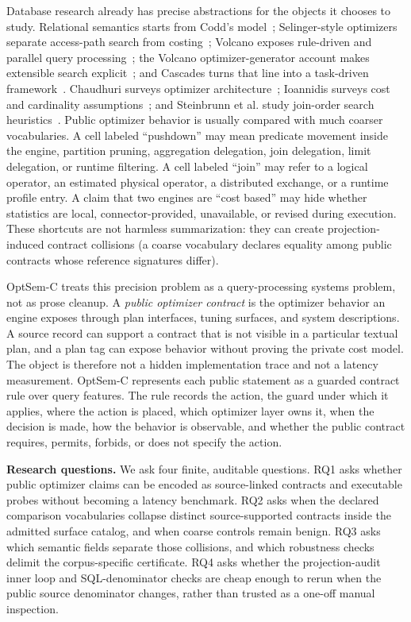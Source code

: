 Database research already has precise abstractions for the objects it chooses to study.  Relational semantics starts from Codd's model~\cite{codd1970relational}; Selinger-style optimizers separate access-path search from costing~\cite{selinger1979access}; Volcano exposes rule-driven and parallel query processing~\cite{graefe1990volcano}; the Volcano optimizer-generator account makes extensible search explicit~\cite{graefe1993volcano}; and Cascades turns that line into a task-driven framework~\cite{graefe1995cascades}.  Chaudhuri surveys optimizer architecture~\cite{chaudhuri1998overview}; Ioannidis surveys cost and cardinality assumptions~\cite{ioannidis1996query}; and Steinbrunn et al. study join-order search heuristics~\cite{steinbrunn1997heuristic}.  Public optimizer behavior is usually compared with much coarser vocabularies.  A cell labeled ``pushdown'' may mean predicate movement inside the engine, partition pruning, aggregation delegation, join delegation, limit delegation, or runtime filtering.  A cell labeled ``join'' may refer to a logical operator, an estimated physical operator, a distributed exchange, or a runtime profile entry.  A claim that two engines are ``cost based'' may hide whether statistics are local, connector-provided, unavailable, or revised during execution.  These shortcuts are not harmless summarization: they can create projection-induced contract collisions (a coarse vocabulary declares equality among public contracts whose reference signatures differ).

OptSem-C treats this precision problem as a query-processing systems problem, not as prose cleanup.  A \emph{public optimizer contract} is the optimizer behavior an engine exposes through plan interfaces, tuning surfaces, and system descriptions.  A source record can support a contract that is not visible in a particular textual plan, and a plan tag can expose behavior without proving the private cost model.  The object is therefore not a hidden implementation trace and not a latency measurement.  OptSem-C represents each public statement as a guarded contract rule over query features.  The rule records the action, the guard under which it applies, where the action is placed, which optimizer layer owns it, when the decision is made, how the behavior is observable, and whether the public contract requires, permits, forbids, or does not specify the action.

\textbf{Research questions.}  We ask four finite, auditable questions.  RQ1 asks whether public optimizer claims can be encoded as source-linked contracts and executable probes without becoming a latency benchmark.  RQ2 asks when the declared comparison vocabularies collapse distinct source-supported contracts inside the admitted surface catalog, and when coarse controls remain benign.  RQ3 asks which semantic fields separate those collisions, and which robustness checks delimit the corpus-specific certificate.  RQ4 asks whether the projection-audit inner loop and SQL-denominator checks are cheap enough to rerun when the public source denominator changes, rather than trusted as a one-off manual inspection.

